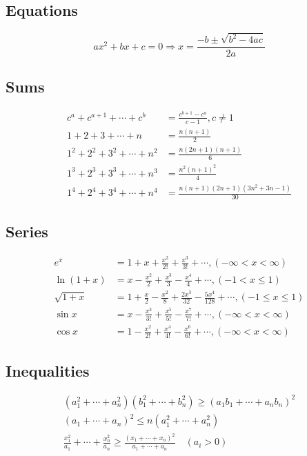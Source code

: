 \subsection*{Equations}

\[
ax^2 + bx + c = 0 \Rightarrow x = \frac{-b \pm \sqrt{b^2 - 4ac}}{2a}
\]
\subsection*{Sums}

\begin{align*}
    c^a + c^{a+1} + \cdots + c^b &= \frac{c^{b+1} - c^a}{c - 1}, c \neq 1 \\
    1 + 2 + 3 + \cdots + n &= \frac{n(n+1)}{2} \\
    1^2 + 2^2 + 3^2 + \cdots + n^2 &= \frac{n(2n+1)(n+1)}{6} \\
    1^3 + 2^3 + 3^3 + \cdots + n^3 &= \frac{n^2(n+1)^2}{4} \\
    1^4 + 2^4 + 3^4 + \cdots + n^4 &= \frac{n(n+1)(2n+1)(3n^2 + 3n - 1)}{30}
\end{align*}

\subsection*{Series}

\begin{align*}
    e^x &= 1 + x + \frac{x^2}{2!} + \frac{x^3}{3!} + \cdots, (-\infty < x < \infty) \\
    \ln(1+x) &= x - \frac{x^2}{2} + \frac{x^3}{3} - \frac{x^4}{4} + \cdots, (-1 < x \le 1) \\
    \sqrt{1+x} &= 1 + \frac{x}{2} - \frac{x^2}{8} + \frac{2x^3}{32} - \frac{5x^4}{128} + \cdots, (-1 \le x \le 1) \\
    \sin x &= x - \frac{x^3}{3!} + \frac{x^5}{5!} - \frac{x^7}{7!} + \cdots, (-\infty < x < \infty) \\
    \cos x &= 1 - \frac{x^2}{2!} + \frac{x^4}{4!} - \frac{x^6}{6!} + \cdots, (-\infty < x < \infty)
\end{align*}

\subsection*{Inequalities}

\begin{gather*}
    (a_1^2 + \cdots + a_n^2)(b_1^2 + \cdots + b_n^2) \ge (a_1 b_1 + \cdots + a_n b_n)^2 \\
    (a_1 + \cdots + a_n)^2 \le n(a_1^2 + \cdots + a_n^2) \\
    \frac{x_1^2}{a_1} + \cdots + \frac{x_n^2}{a_n} \ge \frac{(x_1 + \cdots + x_n)^2}{a_1 + \cdots + a_n} \quad (a_i > 0)
\end{gather*}

